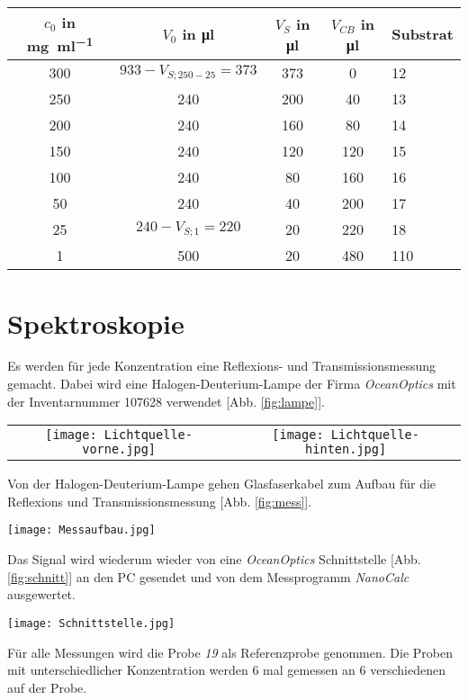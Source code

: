 \begin{center}
	\captionsetup{type=table}	
	\begin{tabular}{c | c | c c | l}
		$c_0$ in \si{\milli\gram\per\milli\litre} & $V_0$ in \si{\micro\litre}  & $V_S$ in \si{\micro\litre} & $V_{CB}$ in \si{\micro\litre} & Substrat \\[0,1cm]
		\hline
		300  &  $933 - V_{S;250-25} = 373$  &  373  &    0  &   12 \\
		250  &  					  240   &  200  &   40  &   13 \\
		200  &  					  240   &  160  &   80  &   14 \\
		150  &  					  240   &  120  &  120  &   15 \\
		100  &  					  240   &   80  &  160  &   16 \\
		 50  &  					  240   &   40  &  200  &   17 \\
		 25  &  $240 - V_{S;1}		= 220$  &   20  &  220  &   18 \\
		  1  &  					  500   &   20  &  480  &  110 \\
	\end{tabular}
	\label{tab:verduennung}
\end{center}

\section{Spektroskopie}
\label{sec:spectroskopie}

Es werden für jede Konzentration eine Reflexions- und Transmissionsmessung gemacht. Dabei wird eine Halogen-Deuterium-Lampe der Firma \textit{OceanOptics} mit der Inventarnummer 107628 verwendet [Abb. \ref{fig:lampe}].
\begin{center}
	\captionsetup{type=figure}
	\begin{tabular}{c c}
		\texttt{[image: Lichtquelle-vorne.jpg]} & \texttt{[image: Lichtquelle-hinten.jpg]}
	\end{tabular}
	\label{fig:lampe}
\end{center}
\newpage
Von der Halogen-Deuterium-Lampe gehen Glasfaserkabel zum Aufbau für die Reflexions und Transmissionsmessung [Abb. \ref{fig:mess}].
\begin{center}
	\captionsetup{type=figure}
	\texttt{[image: Messaufbau.jpg]}
	\label{fig:mess}
\end{center}
Das Signal wird wiederum wieder von eine \textit{OceanOptics} Schnittstelle [Abb. \ref{fig:schnitt}] an den PC gesendet und von dem Messprogramm \textit{NanoCalc} ausgewertet.
\begin{center}
	\captionsetup{type=figure}
	\texttt{[image: Schnittstelle.jpg]}
	\label{fig:schnitt}
\end{center}
\newpage
Für alle Messungen wird die Probe \textit{19} als Referenzprobe genommen. Die Proben mit unterschiedlicher Konzentration werden 6 mal gemessen an 6 verschiedenen auf der Probe.\bigskip

